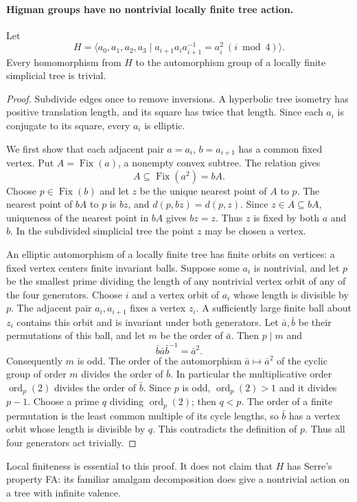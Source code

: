 \paragraph{Higman groups have no nontrivial locally finite tree action.}
Let
\[
 H=\langle a_0,a_1,a_2,a_3\mid
       a_{i+1}a_i a_{i+1}^{-1}=a_i^2\ (i\bmod4)\rangle.
\]
Every homomorphism from $H$ to the automorphism group of a locally
finite simplicial tree is trivial.

\begin{proof}
Subdivide edges once to remove inversions. A hyperbolic tree isometry
has positive translation length, and its square has twice that length.
Since each $a_i$ is conjugate to its square, every $a_i$ is elliptic.

We first show that each adjacent pair $a=a_i$, $b=a_{i+1}$ has a
common fixed vertex. Put $A=\operatorname{Fix}(a)$, a nonempty convex
subtree. The relation gives
\[
 A\subseteq\operatorname{Fix}(a^2)=bA.
\]
Choose $p\in\operatorname{Fix}(b)$ and let $z$ be the unique nearest
point of $A$ to $p$. The nearest point of $bA$ to $p$ is $bz$, and
$d(p,bz)=d(p,z)$. Since $z\in A\subseteq bA$, uniqueness of the
nearest point in $bA$ gives $bz=z$. Thus $z$ is fixed by both $a$ and $b$.
In the subdivided simplicial tree the point $z$ may be chosen a vertex.

An elliptic automorphism of a locally finite tree has finite orbits
on vertices: a fixed vertex centers finite invariant balls. Suppose
some $a_i$ is nontrivial, and let $p$ be the smallest prime dividing
the length of any nontrivial vertex orbit of any of the four generators.
Choose $i$ and a vertex orbit of $a_i$ whose length is divisible by $p$.
The adjacent pair $a_i,a_{i+1}$ fixes a vertex $z_i$. A sufficiently
large finite ball about $z_i$ contains this orbit and is invariant under
both generators. Let $\bar a,\bar b$ be their permutations of this ball,
and let $m$ be the order of $\bar a$. Then $p\mid m$ and
\[
 \bar b\bar a\bar b^{-1}=\bar a^2.
\]
Consequently $m$ is odd. The order of the automorphism
$\bar a\mapsto\bar a^2$ of the cyclic group of order $m$ divides
the order of $\bar b$. In particular the multiplicative order
$\operatorname{ord}_p(2)$ divides the order of $\bar b$.
Since $p$ is odd, $\operatorname{ord}_p(2)>1$ and it divides $p-1$.
Choose a prime $q$ dividing $\operatorname{ord}_p(2)$; then $q<p$.
The order of a finite permutation is the least common multiple of
its cycle lengths, so $\bar b$ has a vertex orbit whose length is
divisible by $q$. This contradicts the definition of $p$.
Thus all four generators act trivially.
\end{proof}

Local finiteness is essential to this proof. It does not claim that
$H$ has Serre's property FA: its familiar amalgam decomposition does
give a nontrivial action on a tree with infinite valence.
